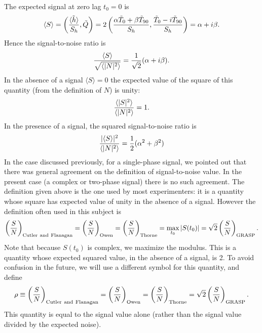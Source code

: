 The expected signal at zero lag $t_0=0$ is
\begin{equation}
\langle S \rangle = \left( { \langle \tilde h \rangle \over S_h}, \tilde Q \right) =
2 \left( {\alpha \tilde T_{0}  + \beta \tilde T_{90} \over S_h} ,  
{\tilde T_{0} -i \tilde T_{90} \over S_h} \right) =  
\alpha +  i \beta.
\end{equation}
Hence the signal-to-noise ratio is
\begin{equation}
{\langle S \rangle \over \sqrt{\langle |N|^2 \rangle} } = \frac{1}{\sqrt{2}}
(\alpha + i \beta).
\end{equation}
In the absence of a signal $\langle S \rangle=0$ the expected value of the square of
this quantity (from the definition of $N$) is unity:
\begin{equation}
{\langle |S|^2 \rangle \over \langle |N|^2 \rangle} = 1.
\end{equation}
In the presence of a signal, the squared signal-to-noise ratio is
\begin{equation}
{| \langle S  \rangle |^2 \over \langle |N|^2 \rangle} = \frac{1}{2}
(\alpha^2 + \beta^2)
\end{equation}
In the case discussed previously, for a single-phase signal, we pointed out that
there was general agreement on the definition of signal-to-noise value.  In the present
case (a complex or two-phase signal) there is no such agreement.  The definition given
above is the one used by most experimenters: it is a quantity whose square has expected value
of unity in the absence of a signal.  However the definition often used in this
subject is
\begin{equation}
\left( {S \over N} \right)_{\rm Cutler\ and\ Flanagan} =
\left( {S \over N} \right)_{\rm Owen} =
\left( {S \over N} \right)_{\rm Thorne} = \max_{t_0} | S(t_0) |=
\sqrt{2} \left( {S \over N} \right)_{\rm GRASP}.
\end{equation}
Note that because ${S(t_0)}$ is complex, we maximize the modulus.
This is a quantity whose expected squared value, in the absence of a
signal, is 2.  To avoid confusion in the future, we will use a different
symbol for this quantity, and define
\begin{equation}
\rho \equiv 
\left( {S \over N} \right)_{\rm Cutler\ and\ Flanagan} =
\left( {S \over N} \right)_{\rm Owen} =
\left( {S \over N} \right)_{\rm Thorne} =
\sqrt{2} \left( {S \over N} \right)_{\rm GRASP}.
\end{equation}
This quantity is equal to the signal value alone (rather than the signal
value divided by the expected noise).

